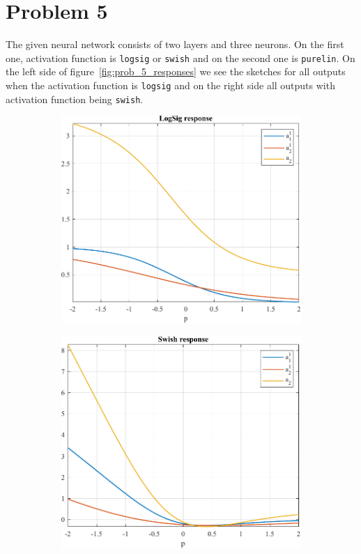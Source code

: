 \section{Problem 5}

The given neural network consists of two layers and three neurons. On the first one, activation function is \verb*|logsig| or \verb*|swish| and on the second one is \verb*|purelin|. On the left side of figure~\ref{fig:prob_5_responses} we see the sketches for all outputs when the activation function is \verb*|logsig| and on the right side all outputs with activation function being \verb*|swish|.

\begin{figure}[H]
	\centering
	\begin{subfigure}{0.47\textwidth}
		\centering
		\caption{}
		\includegraphics[width=\textwidth]{../Problem 5/logsig_activation.pdf}
	\end{subfigure}
	\hspace{1mm}
	\begin{subfigure}{0.47\textwidth}
		\centering
		\caption{}
		\includegraphics[width=\textwidth]{../Problem 5/swish_activation.pdf}

\end{subfigure}
\end{figure}
